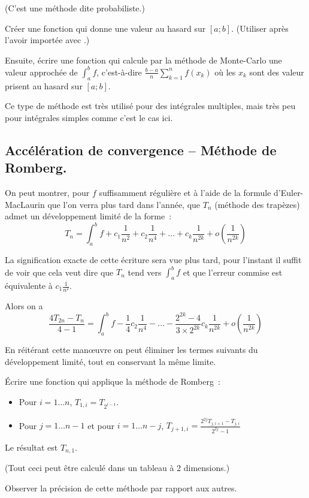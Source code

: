 \documentclass[french,11pt,twoside]{VcCours}
\begin{document}
(C'est une méthode dite probabiliste.)

\begin{Exercice}{}
Créer une fonction  qui donne une valeur au hasard
sur $[a;b]$. (Utiliser  après l'avoir importée avec .)

Ensuite, écrire une fonction  qui calcule
par la méthode de Monte-Carlo une valeur approchée de $\int_a^bf$,
c'est-à-dire $\frac{b-a}{n}\sum_{k=1}^nf(x_k)$ où les $x_k$ sont des
valeur prisent au hasard sur $[a;b]$.
\end{Exercice}

Ce type de méthode est très utilisé pour des intégrales multiples,
mais très peu pour intégrales simples comme c'est le cas ici.

\subsection{Accélération de convergence -- Méthode de Romberg.}
On peut montrer, pour $f$ suffisamment régulière et à l'aide de la
formule d'Euler-MacLaurin que l'on verra plus tard dans l'année, que
$T_n$ (méthode des trapèzes) admet un développement limité de la
forme~: \[T_n=\int_a^bf+c_1\frac{1}{n^2}+c_2\frac{1}{n^4}+
\dots+c_k\frac{1}{n^{2k}}+o\left({\frac{1}{n^{2k}}}\right)\]

La signification exacte de cette écriture sera vue plus tard, pour
l'instant il suffit de voir que cela veut dire que $T_n$ tend vers
$\int_a^bf$ et que l'erreur commise est équivalente à
$c_1\frac{1}{n^2}$.

\medskip
Alors on a
\[\frac{4T_{2n}-T_n}{4-1}=\int_a^bf-\frac{1}{4}c_2\frac{1}{n^4}-
\dots-\frac{2^{2k}-4}{3\times2^{2k}}c_k\frac{1}{n^{2k}}
+o\left(\frac{1}{n^{2k}}\right)\]

En réitérant cette man{\oe}uvre on peut éliminer les termes
suivants du développement limité, tout en conservant la même limite.

\begin{Exercice}{}
Écrire une fonction  qui applique la
méthode de Romberg~:
\begin{itemize}
  \item Pour $i=1\ldots n$, $T_{1,i}=T_{2^{i-1}}$.
  \item Pour $j=1\ldots n-1$ et pour $i=1\ldots n-j$, $T_{j+1,i}=\frac{2^{2j}T_{j,i+1}-T_{j,i}}{2^{2j}-1}$
\end{itemize}
Le résultat est $T_{n,1}$.

(Tout ceci peut être calculé dans un tableau à 2 dimensions.)

Observer la précision de cette méthode par rapport aux autres.
\end{Exercice}
\end{document}
